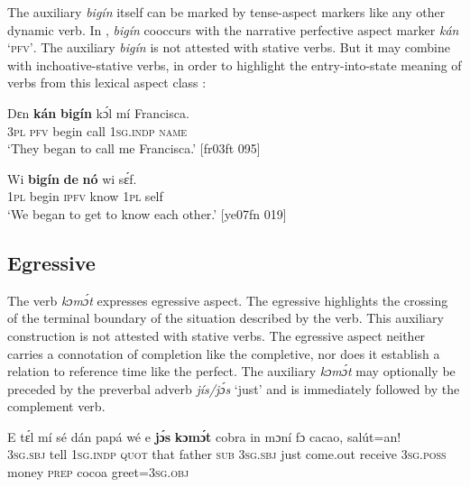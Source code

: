 The auxiliary \textit{bigín} itself can be marked by tense-aspect markers like any other dynamic verb. In , \textit{bigín} cooccurs with the narrative perfective aspect marker \textit{kán} ‘\textsc{pfv’}. The auxiliary \textit{bigín} is not attested with stative verbs. But it may combine with inchoative-stative verbs, in order to highlight the entry-into-state meaning of verbs from this lexical aspect class : 


\ea%
    \label{ex:key:352}
    \gll Dɛn  \textbf{kán}  \textbf{bigín}  kɔ́l  mí    Francisca.\\
\textsc{3pl}  \textsc{pfv}  begin  call  \textsc{1sg.indp}  \textsc{name}\\

\glt ‘They began to call me Francisca.’ [fr03ft 095]
\z


\ea%
    \label{ex:key:353}
    \gll Wi  \textbf{bigín}  \textbf{de}  \textbf{nó}    wi  sɛ́f.\\
\textsc{1pl}  begin  \textsc{ipfv}  know  \textsc{1pl}  self\\

\glt ‘We began to get to know each other.’ [ye07fn 019]
\z

\subsection{Egressive}\label{sec:6.4.2}

The verb \textit{kɔmɔ́t} expresses egressive aspect. The egressive highlights the crossing of the terminal boundary of the situation described by the verb. This auxiliary construction is not attested with stative verbs. The egressive aspect neither carries a connotation of completion like the completive, nor does it establish a relation to reference time like the perfect. The auxiliary \textit{kɔmɔ́t} may optionally be preceded by the preverbal adverb \textit{jís/jɔ́s} ‘just’ and is immediately followed by the complement verb. 


\ea%
    \label{ex:key:354}
    \gll E    tɛ́l  mí    sé    dán    papá  wé  e    \textbf{jɔ́s}  \textbf{kɔmɔ́t}
cobra   in    mɔní  fɔ  cacao,  salút=an!\\
\textsc{3sg.sbj}  tell  \textsc{1sg.indp}  \textsc{quot}    that    father  \textsc{sub}  \textsc{3sg.sbj}  just  come.out
receive  \textsc{3sg.poss}  money  \textsc{prep}  cocoa  greet=\textsc{3sg.obj}\\

